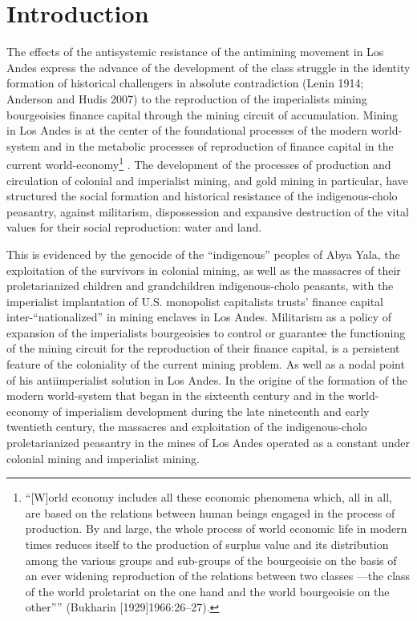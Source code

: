 \documentclass[]{interact}
\theoremstyle{plain}%
\theoremstyle{definition}
\theoremstyle{remark}
\begin{document}
\section{Introduction}
The effects of the antisystemic resistance of the antimining movement in Los Andes express the advance of the development of the class struggle in the identity formation of historical challengers in absolute contradiction (Lenin 1914; Anderson and Hudis 2007) to the reproduction of the imperialists mining bourgeoisies finance capital through the mining circuit of accumulation. 
Mining in Los Andes is at the center of the foundational processes of the modern world-system and in the metabolic processes of reproduction of finance capital in the current world-economy\footnote{“[W]orld economy includes all these economic phenomena which, all in all, are based on the relations between human beings engaged in the process of production. By and large, the whole process of world economic life in modern times reduces itself to the production of surplus value and its distribution among the various groups and sub-groups of the bourgeoisie on the basis of an ever widening reproduction of the relations between two classes —the class of the world proletariat on the one hand and the world bourgeoisie on the other”” (Bukharin [1929]1966:26–27).} . The development of the processes of production and circulation of colonial and imperialist mining, and gold mining in particular, have structured the social formation and historical resistance of the indigenous-cholo peasantry, against militarism, dispossession and expansive destruction of the vital values for their social reproduction: water and land.

This is evidenced by the genocide of the “indigenous” peoples of Abya Yala, the exploitation of the survivors in colonial mining, as well as the massacres of their proletarianized children and grandchildren indigenous-cholo peasants, with the imperialist implantation of U.S. monopolist capitalists trusts’ finance capital inter-“nationalized” in mining enclaves in Los Andes. Militarism as a policy of expansion of the imperialists bourgeoisies to control or guarantee the functioning of the mining circuit for the reproduction of their finance capital, is a persistent feature of the coloniality of the current mining problem. As well as a nodal point of his antiimperialist solution in Los Andes. In the origine of the formation of the modern world-system that began in the sixteenth century and in the world-economy of imperialism development during the late nineteenth and early twentieth century, the massacres and exploitation of the indigenous-cholo proletarianized peasantry in the mines of Los Andes operated as a constant under colonial mining and imperialist mining.
\end{document}
